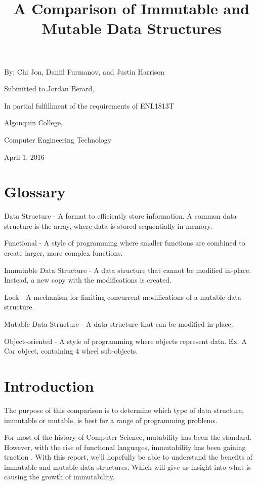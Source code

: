 \documentclass[11pt]{article}
\title{A Comparison of Immutable and Mutable Data Structures}
\author{}
\date{}
\newcommand{\glossaryentry}[2]{#1 - #2}
\begin{document}
\maketitle

\begin{center}
By:  Chi Jon, Daniil Furmanov, and Justin Harrison

\hfill

Submitted to Jordan Berard,

In partial fulfillment of the requirements of ENL1813T

\hfill

Algonquin College,

Computer Engineering Technology

\hfill

April 1, 2016

\clearpage
\end{center}

\section*{Glossary}
\glossaryentry{Data Structure}{
  A format to efficiently store information. A common data
  structure is the array, where data is stored sequentially in memory.
}

\glossaryentry{Functional}{
  A style of programming where smaller functions are combined to create larger,
  more complex functions.
}

\glossaryentry{Immutable Data Structure}{
  A data structure that cannot be modified in-place.
  Instead, a new copy with the modifications is created.
}

\glossaryentry{Lock}{
  A mechanism for limiting concurrent modifications of a mutable data
  structure.
}

\glossaryentry{Mutable Data Structure}{
  A data structure that can be modified in-place.
}

\glossaryentry{Object-oriented}{
  A style of programming where objects represent data. Ex. A Car object,
  containing 4 wheel sub-objects.
}
\clearpage

\section*{Introduction}
The purpose of this comparison is to determine which type of data structure,
immutable or mutable, is best for a range of programming problems.

For most of the history of Computer Science, mutability has been the standard.
However, with the rise of functional languages, immutability has been gaining
traction \cite{ieee_spectrum}. With this report, we'll hopefully be able to
understand the benefits of immutable and mutable data structures. Which will
give us insight into what is causing the growth of immutability.
\end{document}
